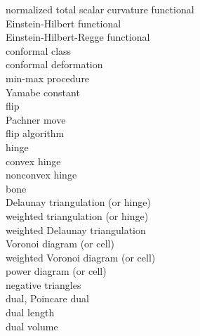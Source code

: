 \begin{description}
\item[normalized total scalar curvature functional] 

\item[Einstein-Hilbert functional] 

\item[Einstein-Hilbert-Regge functional] 

\item[conformal class] 

\item[conformal deformation] 

\item[min-max procedure] 

\item[Yamabe constant] 

\item[flip] 

\item[Pachner move] 

\item[flip algorithm] 

\item[hinge] 

\item[convex hinge] 

\item[nonconvex hinge] 

\item[bone] 

\item[Delaunay triangulation (or hinge)] 

\item[weighted triangulation (or hinge)] 

\item[weighted Delaunay triangulation] 

\item[Voronoi diagram (or cell)] 

\item[weighted Voronoi diagram (or cell)] 

\item[power diagram (or cell)] 

\item[negative triangles] 

\item[dual, Poincare dual] 

\item[dual length] 

\item[dual volume] 
\end{description}
